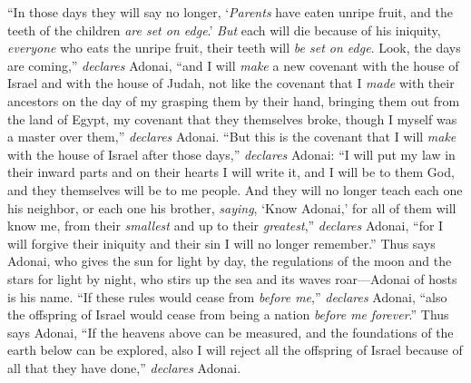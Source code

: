 \begin{biblechapter}
\verse “In those days they will say no longer, ‘\textit{Parents} have eaten unripe fruit, and the teeth of the children \textit{are set on edge}.’
\verse \textit{But} each will die because of his iniquity, \textit{everyone} who eats the unripe fruit, their teeth will \textit{be set on edge}.
\verse Look, the days are coming,” \textit{declares} Adonai, “and I will \textit{make} a new covenant with the house of Israel and with the house of Judah,
\verse not like the covenant that I \textit{made} with their ancestors on the day of my grasping them by their hand, bringing them out from the land of Egypt, my covenant that they themselves broke, though I myself was a master over them,” \textit{declares} Adonai.
\verse “But this is the covenant that I will \textit{make} with the house of Israel after those days,” \textit{declares} Adonai: “I will put my law in their inward parts and on their hearts I will write it, and I will be to them God, and they themselves will be to me people.
\verse And they will no longer teach each one his neighbor, or each one his brother, \textit{saying}, ‘Know Adonai,’ for all of them will know me, from their \textit{smallest} and up to their \textit{greatest},” \textit{declares} Adonai, “for I will forgive their iniquity and their sin I will no longer remember.”
\verse Thus says Adonai, who gives the sun for light by day, the regulations of the moon and the stars for light by night, who stirs up the sea and its waves roar—Adonai of hosts is his name.
\verse “If these rules would cease from \textit{before me},” \textit{declares} Adonai, “also the offspring of Israel would cease from being a nation \textit{before me} \textit{forever}.”
\verse Thus says Adonai, “If the heavens above can be measured, and the foundations of the earth below can be explored, also I will reject all the offspring of Israel because of all that they have done,” \textit{declares} Adonai.

\end{biblechapter}
